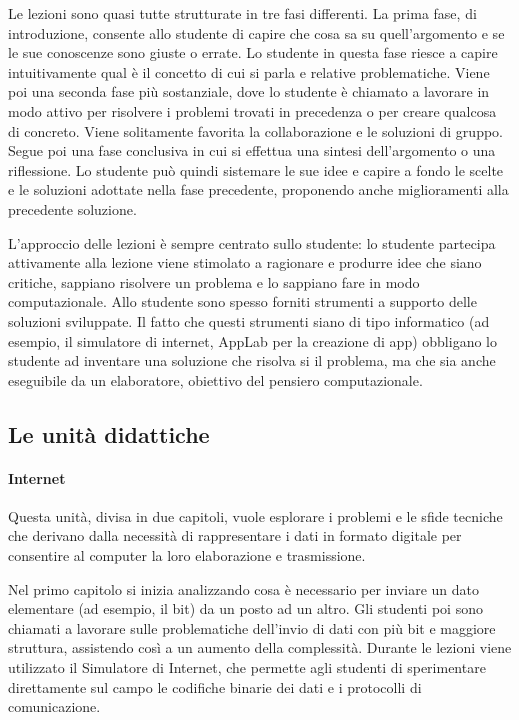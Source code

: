 \documentclass[11pt,a4paper]{article}
\begin{document}
Le lezioni sono quasi tutte strutturate in tre fasi differenti. La
prima fase, di introduzione, consente allo studente di capire che cosa
sa su quell'argomento e se le sue conoscenze sono giuste o errate. Lo
studente in questa fase riesce a capire intuitivamente qual è il
concetto di cui si parla e relative problematiche. Viene poi una
seconda fase più sostanziale, dove lo studente è chiamato a lavorare
in modo attivo per risolvere i problemi trovati in precedenza o per
creare qualcosa di concreto. Viene solitamente favorita la
collaborazione e le soluzioni di gruppo. Segue poi una fase conclusiva
in cui si effettua una sintesi dell'argomento o una riflessione. Lo
studente può quindi sistemare le sue idee e capire a fondo le scelte e
le soluzioni adottate nella fase precedente, proponendo anche
miglioramenti alla precedente soluzione.

L'approccio delle lezioni è sempre centrato sullo studente: lo
studente partecipa attivamente alla lezione viene stimolato a
ragionare e produrre idee che siano critiche, sappiano risolvere un
problema e lo sappiano fare in modo computazionale. Allo studente sono
spesso forniti strumenti a supporto delle soluzioni sviluppate. Il
fatto che questi strumenti siano di tipo informatico (ad esempio, il
simulatore di internet, AppLab per la creazione di app) obbligano lo
studente ad inventare una soluzione che risolva si il problema, ma che
sia anche eseguibile da un elaboratore, obiettivo del pensiero
computazionale.

\subsection{Le unità didattiche}

\paragraph{Internet}

Questa unità, divisa in due capitoli, vuole esplorare i problemi e le
sfide tecniche che derivano dalla necessità di rappresentare i dati in
formato digitale per consentire al computer la loro elaborazione e
trasmissione.

Nel primo capitolo si inizia analizzando cosa è necessario per inviare
un dato elementare (ad esempio, il bit) da un posto ad un altro. Gli
studenti poi sono chiamati a lavorare sulle problematiche dell'invio
di dati con più bit e maggiore struttura, assistendo così a un aumento
della complessità. Durante le lezioni viene utilizzato il Simulatore
di Internet, che permette agli studenti di sperimentare direttamente
sul campo le codifiche binarie dei dati e i protocolli di
comunicazione.
\end{document}

